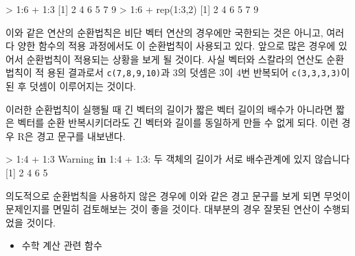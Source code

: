 \documentclass[
]{book}
\newenvironment{Shaded}{\begin{snugshade}}{\end{snugshade}}
\newcommand{\ControlFlowTok}[1]{\textcolor[rgb]{0.13,0.29,0.53}{\textbf{#1}}}
\newcommand{\DecValTok}[1]{\textcolor[rgb]{0.00,0.00,0.81}{#1}}
\newcommand{\FunctionTok}[1]{\textcolor[rgb]{0.00,0.00,0.00}{#1}}
\newcommand{\NormalTok}[1]{#1}
\newcommand{\SpecialCharTok}[1]{\textcolor[rgb]{0.00,0.00,0.00}{#1}}
\providecommand{\tightlist}{%
  \setlength{\itemsep}{0pt}\setlength{\parskip}{0pt}}
\begin{document}
\begin{Shaded}
\begin{Highlighting}[]
\SpecialCharTok{\textgreater{}} \DecValTok{1}\SpecialCharTok{:}\DecValTok{6} \SpecialCharTok{+} \DecValTok{1}\SpecialCharTok{:}\DecValTok{3}
\NormalTok{[}\DecValTok{1}\NormalTok{] }\DecValTok{2} \DecValTok{4} \DecValTok{6} \DecValTok{5} \DecValTok{7} \DecValTok{9}
\SpecialCharTok{\textgreater{}} \DecValTok{1}\SpecialCharTok{:}\DecValTok{6} \SpecialCharTok{+} \FunctionTok{rep}\NormalTok{(}\DecValTok{1}\SpecialCharTok{:}\DecValTok{3}\NormalTok{,}\DecValTok{2}\NormalTok{)}
\NormalTok{[}\DecValTok{1}\NormalTok{] }\DecValTok{2} \DecValTok{4} \DecValTok{6} \DecValTok{5} \DecValTok{7} \DecValTok{9}
\end{Highlighting}
\end{Shaded}

이와 같은 연산의 순환법칙은 비단 벡터 연산의 경우에만 국한되는 것은 아니고, 여러 다
양한 함수의 적용 과정에서도 이 순환법칙이 사용되고 있다. 앞으로 많은 경우에 있어서
순환법칙이 적용되는 상황을 보게 될 것이다. 사실 벡터와 스칼라의 연산도 순환법칙이 적
용된 결과로서 \texttt{c(7,8,9,10)}과 3의 덧셈은 3이 4번 반복되어 \texttt{c(3,3,3,3)}이 된 후 덧셈이
이루어지는 것이다.

이러한 순환법칙이 실행될 때 긴 벡터의 길이가 짧은 벡터 길이의 배수가 아니라면 짧은 벡터를 순환 반복시키더라도 긴 벡터와 길이를 동일하게 만들 수 없게 되다. 이런 경우
R은 경고 문구를 내보낸다.

\begin{Shaded}
\begin{Highlighting}[]
\SpecialCharTok{\textgreater{}} \DecValTok{1}\SpecialCharTok{:}\DecValTok{4} \SpecialCharTok{+} \DecValTok{1}\SpecialCharTok{:}\DecValTok{3}
\NormalTok{Warning }\ControlFlowTok{in} \DecValTok{1}\SpecialCharTok{:}\DecValTok{4} \SpecialCharTok{+} \DecValTok{1}\SpecialCharTok{:}\DecValTok{3}\SpecialCharTok{:}\NormalTok{ 두 객체의 길이가 서로 배수관계에 있지 않습니다}
\NormalTok{[}\DecValTok{1}\NormalTok{] }\DecValTok{2} \DecValTok{4} \DecValTok{6} \DecValTok{5}
\end{Highlighting}
\end{Shaded}

의도적으로 순환법칙을 사용하지 않은 경우에 이와 같은 경고 문구를 보게 되면 무엇이 문제인지를 면밀히 검토해보는 것이 좋을 것이다. 대부분의 경우 잘못된 연산이 수행되었을
것이다.

\begin{itemize}
\tightlist
\item
  수학 계산 관련 함수
\end{itemize}
\end{document}
